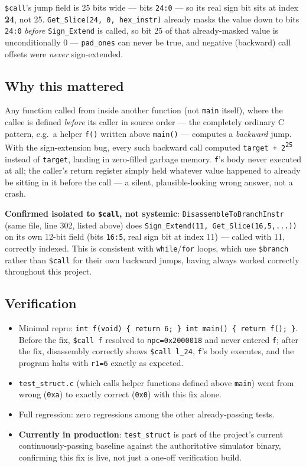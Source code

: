 \documentclass[11pt,a4paper]{report}
\begin{document}
\texttt{\$call}'s jump field is 25 bits wide --- bits \texttt{24:0} --- so its real sign bit
sits at index \textbf{24}, not 25. \texttt{Get\_Slice(24, 0, hex\_instr)} already masks the
value down to bits \texttt{24:0} \emph{before} \texttt{Sign\_Extend} is called, so bit 25 of
that already-masked value is unconditionally 0 --- \texttt{pad\_ones} can never be true, and
negative (backward) call offsets were \emph{never} sign-extended.

\subsection*{Why this mattered}
Any function called from inside another function (not \texttt{main} itself), where the
callee is defined \emph{before} its caller in source order --- the completely ordinary C
pattern, e.g.\ a helper \texttt{f()} written above \texttt{main()} --- computes a
\emph{backward} jump. With the sign-extension bug, every such backward call computed
\texttt{target + 2\textsuperscript{25}} instead of \texttt{target}, landing in zero-filled
garbage memory. \texttt{f}'s body never executed at all; the caller's return register
simply held whatever value happened to already be sitting in it before the call --- a
silent, plausible-looking wrong answer, not a crash.

\textbf{Confirmed isolated to \texttt{\$call}, not systemic}: \texttt{DisassembleToBranchInstr}
(same file, line 302, listed above) does \texttt{Sign\_Extend(11, Get\_Slice(16,5,...))} on
its own 12-bit field (bits \texttt{16:5}, real sign bit at index 11) --- called with 11,
correctly indexed. This is consistent with \texttt{while}/\texttt{for} loops, which use
\texttt{\$branch} rather than \texttt{\$call} for their own backward jumps, having always
worked correctly throughout this project.

\subsection*{Verification}
\begin{itemize}
  \item Minimal repro: \texttt{int f(void) \{ return 6; \} int main() \{ return f(); \}}.
        Before the fix, \texttt{\$call f} resolved to \texttt{npc=0x2000018} and never
        entered \texttt{f}; after the fix, disassembly correctly shows \texttt{\$call l\_24},
        \texttt{f}'s body executes, and the program halts with \texttt{r1=6} exactly as
        expected.
  \item \texttt{test\_struct.c} (which calls helper functions defined above \texttt{main})
        went from wrong (\texttt{0xa}) to exactly correct (\texttt{0x0}) with this fix alone.
  \item Full regression: zero regressions among the other already-passing tests.
  \item \textbf{Currently in production}: \texttt{test\_struct} is part of the project's
        current continuously-passing baseline against the authoritative simulator binary,
        confirming this fix is live, not just a one-off verification build.
\end{itemize}
\end{document}
